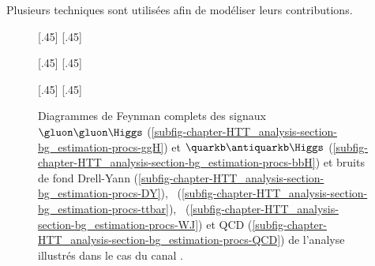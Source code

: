 Plusieurs techniques sont utilisées afin de modéliser leurs contributions.
\begin{figure}[h]
\centering

\vspace{\baselineskip}

[.45\textwidth]
{\vspace{\baselineskip}}
\hfill
{}[.45\textwidth]
{\vspace{\baselineskip}}

\vspace{2\baselineskip}

[.45\textwidth]
{\vspace{\baselineskip}}
\hfill
{}[.45\textwidth]
{\vspace{\baselineskip}}

\vspace{2\baselineskip}

[.45\textwidth]
{\vspace{\baselineskip}}
\hfill
{}[.45\textwidth]
{\vspace{\baselineskip}}

\caption[Diagrammes de Feynman des signaux et principaux bruits de fond de l'analyse.]{Diagrammes de Feynman complets des signaux $\gluon\gluon\Higgs$ (\ref{subfig-chapter-HTT_analysis-section-bg_estimation-procs-ggH}) et $\quarkb\antiquarkb\Higgs$ (\ref{subfig-chapter-HTT_analysis-section-bg_estimation-procs-bbH}) et bruits de fond Drell-Yann (\ref{subfig-chapter-HTT_analysis-section-bg_estimation-procs-DY}), \ttbar\ (\ref{subfig-chapter-HTT_analysis-section-bg_estimation-procs-ttbar}), \Wjets\ (\ref{subfig-chapter-HTT_analysis-section-bg_estimation-procs-WJ}) et QCD (\ref{subfig-chapter-HTT_analysis-section-bg_estimation-procs-QCD}) de l'analyse illustrés dans le cas du canal \mu\tauh.}
\label{fig-chapter-HTT_analysis-section-bg_estimation-procs}
\end{figure}
